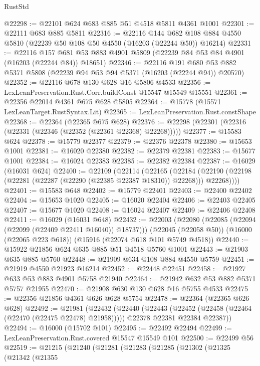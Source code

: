 \begin{lexlean}{RustStd}
\begin{coremodule}
@22298 := @22101 @624 @683 @885 @51 @4518 @5811 @4361 @1001
@22301 := @22111 @683 @885 @5811
@22316 := @22116
    @144
    @682
    @108
    @884
    @4550
    @5810
    (@22239 @50 @108 @50 @4550 (@16203 (@22244 @50)) @16214)
@22331 := @22116
    @157
    @681
    @53
    @883
    @4901
    @5809
    (@22239 @84 @53 @84 @4901 (@16203 (@22244 @84)) @18651)
@22346 := @22116
    @191
    @680
    @53
    @882
    @5371
    @5808
    (@22239 @94 @53 @94 @5371 (@16203 (@22244 @94)) @20570)
@22352 := @22116 @678 @130 @628 @16 @5806 @4533
@22356 := LexLeanPreservation.Rust.Corr.buildConst @15547 @15549 @15551
@22361 := @22356 @22014 @4361 @675 @628 @5805
@22364 := @15778 (@15571 LexLeanTarget.RustSyntax.Lit)
@22365 := LexLeanPreservation.Rust.constShape
@22368 := @22364 (@22365 @675 @628)
@22376 := @22298 (@22301 (@22316 (@22331 (@22346 (@22352 (@22361 @22368) @22268)))))
@22377 := @15583 @624
@22378 := @15779 @22377
@22379 := @22376 @22378
@22380 := @15653 @1001
@22381 := @16020 @22380
@22382 := @22379 @22381
@22383 := @15677 @1001
@22384 := @16024 @22383
@22385 := @22382 @22384
@22387 := @16029 (@16031 @624)
@22400 := @22109
    (@22114
      (@22165
        (@22184 (@22190 (@22198 (@22281 (@22287 (@22290 (@22385 @22387 @18310)) @22268))) @22268))))
@22401 := @15583 @648
@22402 := @15779 @22401
@22403 := @22400 @22402
@22404 := @15653 @1020
@22405 := @16020 @22404
@22406 := @22403 @22405
@22407 := @15677 @1020
@22408 := @16024 @22407
@22409 := @22406 @22408
@22411 := @16029 (@16031 @648)
@22432 := @22003
    (@22080 (@22085 (@22094 (@22099 (@22409 @22411 @16040)) @18737)))
    (@22045 (@22058 @50))
    (@16000 (@22065 @223 @618))
    (@15916 (@22074 @618 @101 @5749 @4518))
@22440 := @15922 @21856 @624 @635 @885 @51 @4518 @5760 @1001
@22443 := @21903 @635 @885 @5760
@22448 := @21909 @634 @108 @884 @4550 @5759
@22451 := @21919 @4550 @21923 @16214
@22452 := @22448 @22451
@22458 := @21927 @633 @53 @883 @4901 @5758 @21940
@22464 := @21942 @632 @53 @882 @5371 @5757 @21955
@22470 := @21908 @630 @130 @628 @16 @5755 @4533
@22475 := @22356 @21856 @4361 @626 @628 @5754
@22478 := @22364 (@22365 @626 @628)
@22492 := @21981
    (@22432
      (@22440
        (@22443 (@22452 (@22458 (@22464 (@22470 (@22475 @22478) @21958)))))
        @22378
        @22381
        @22384
        @22387))
@22494 := @16000 (@15702 @101)
@22495 := @22492 @22494
@22499 := LexLeanPreservation.Rust.covered @15547 @15549 @101
@22500 := @22499 @56
@22519 := @21215
    (@21240
      (@21281
        (@21283
          (@21285
            (@21302
              (@21325
                (@21342
                  (@21355

\end{coremodule}
\end{lexlean}
